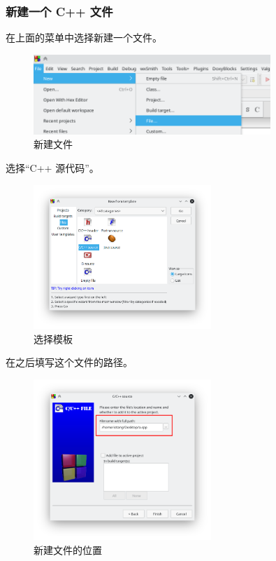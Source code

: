 \documentclass[UTF-8]{ctexart}
\begin{document}
			\subsubsection{新建一个 C++ 文件}

				在上面的菜单中选择新建一个文件。

				\begin{figure}[H]
					\centering
					\includegraphics[width=0.8\textwidth]{fig/cb_new_file.png}
					\caption*{新建文件}
				\end{figure}
			
				选择“C++ 源代码”。
				
				\begin{figure}[H]
					\centering
					\includegraphics[width=0.6\textwidth]{fig/cb_new_template.png}
					\caption*{选择模板}
				\end{figure}
			
				在之后填写这个文件的路径。
	
				\begin{figure}[H]
					\centering
					\includegraphics[width=0.6\textwidth]{fig/cb_new_template_2.png}
					\caption*{新建文件的位置}
				\end{figure}
			
\end{document}
